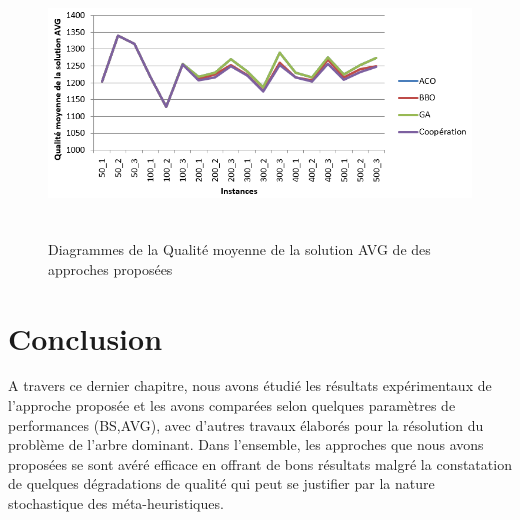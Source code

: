 \begin{figure}[H]
	\centering
	\includegraphics[width=16cm,height=7cm]{Chap5/6.png}
	\caption{Diagrammes de la Qualité moyenne de la solution AVG de des approches proposées}
	\label{fig:DQMSAP}
\end{figure}


\section{Conclusion}
A travers ce dernier chapitre, nous avons étudié les résultats expérimentaux de l’approche proposée et les avons comparées selon quelques paramètres de performances (BS,AVG), avec d’autres travaux élaborés pour la résolution du problème de l’arbre dominant. Dans l’ensemble, les approches que nous avons proposées se sont  avéré efficace en offrant de bons résultats malgré la constatation de quelques dégradations de qualité qui peut se justifier par la nature stochastique des méta-heuristiques.

